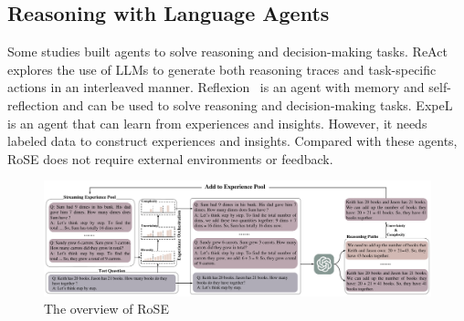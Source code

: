\documentclass[11pt]{article}
\begin{document}
\subsection{Reasoning with Language Agents}
Some studies built agents to solve reasoning and decision-making tasks. ReAct~\cite{yao2023react} explores the use of LLMs to generate both reasoning traces and task-specific actions in an interleaved manner. Reflexion~\cite{shinn203reflexion} is an agent with memory and self-reflection and can be used to solve reasoning and decision-making tasks. ExpeL~\cite{zhao2023expel} is an agent that can learn from experiences and insights. However, it needs labeled data to construct experiences and insights. Compared with these agents, RoSE does not require external environments or feedback.


\begin{figure}[t]
\centering
\includegraphics[width=1.99\columnwidth]{pics/framework.pdf}
\caption{The overview of RoSE}
\label{fg:overview}
\end{figure}
\end{document}
